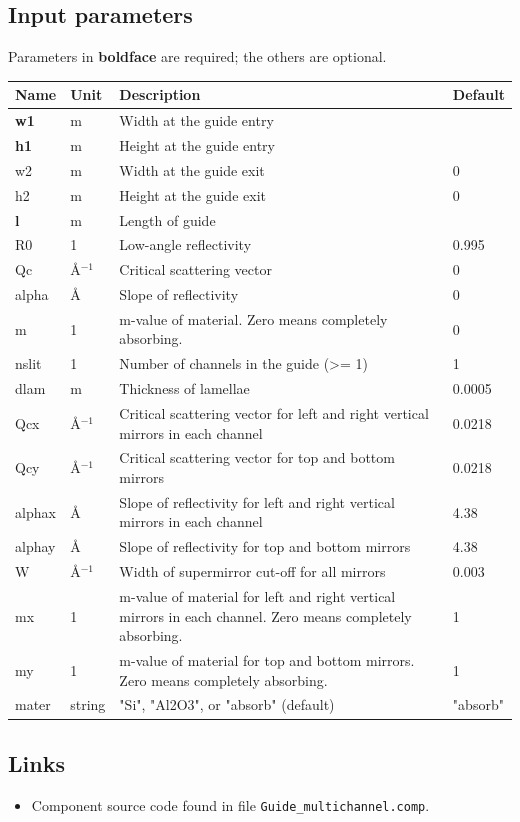 \subsection*{Input parameters}
Parameters in \textbf{boldface} are required; the others are optional.

\begin{longtable}{p{}p{}p{}p{}}
\toprule
\textbf{Name} & \textbf{Unit} & \textbf{Description} & \textbf{Default} \\
\midrule
\endhead
\textbf{w1} & m & Width at the guide entry &  \\
\textbf{h1} & m & Height at the guide entry &  \\
w2 & m & Width at the guide exit & 0 \\
h2 & m & Height at the guide exit & 0 \\
\textbf{l} & m & Length of guide &  \\
R0 & 1 & Low-angle reflectivity & 0.995 \\
Qc & \AA{}$^{-1}$ & Critical scattering vector & 0 \\
alpha & \AA{} & Slope of reflectivity & 0 \\
m & 1 & m-value of material. Zero means completely absorbing. & 0 \\
nslit & 1 & Number of channels in the guide (\textgreater{}= 1) & 1 \\
dlam & m & Thickness of lamellae & 0.0005 \\
Qcx & \AA{}$^{-1}$ & Critical scattering vector for left and right vertical mirrors in each channel & 0.0218 \\
Qcy & \AA{}$^{-1}$ & Critical scattering vector for top and bottom mirrors & 0.0218 \\
alphax & \AA{} & Slope of reflectivity for left and right vertical mirrors in each channel & 4.38 \\
alphay & \AA{} & Slope of reflectivity for top and bottom mirrors & 4.38 \\
W & \AA{}$^{-1}$ & Width of supermirror cut-off for all mirrors & 0.003 \\
mx & 1 & m-value of material for left and right vertical mirrors in each channel. Zero means completely absorbing. & 1 \\
my & 1 & m-value of material for top and bottom mirrors. Zero means completely absorbing. & 1 \\
mater & string & "Si", "Al2O3", or "absorb" (default) & "absorb" \\
\bottomrule
\end{longtable}

\subsection*{Links}
\begin{itemize}
  \item Component source code found in file \texttt{Guide\_multichannel.comp}.
\end{itemize}
